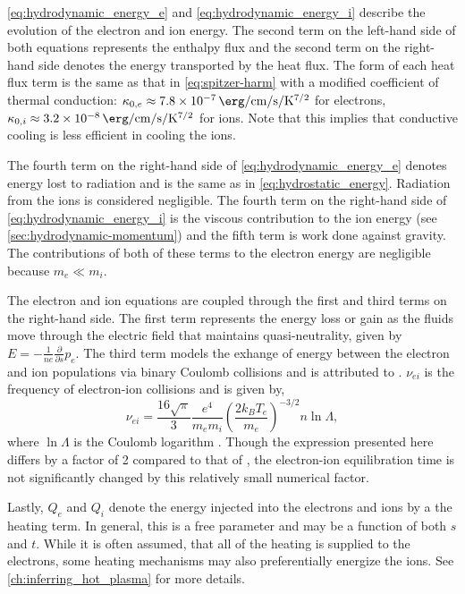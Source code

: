 \autoref{eq:hydrodynamic_energy_e} and \autoref{eq:hydrodynamic_energy_i} describe the evolution of the electron and ion energy. The second term on the left-hand side of both equations represents the enthalpy flux and the second term on the right-hand side denotes the energy transported by the heat flux. The form of each heat flux term is the same as that in \autoref{eq:spitzer-harm} with a modified coefficient of thermal conduction: $\kappa_{0,e}\approx\SI{7.8e-7}{\erg\per\cm\per\second\per\kelvin\tothe{7/2}}$ for electrons, $\kappa_{0,i}\approx\SI{3.2e-8}{\erg\per\cm\per\second\per\kelvin\tothe{7/2}}$ for ions. Note that this implies that conductive cooling is less efficient in cooling the ions. 

The fourth term on the right-hand side of \autoref{eq:hydrodynamic_energy_e} denotes energy lost to radiation and is the same as in \autoref{eq:hydrostatic_energy}. Radiation from the ions is considered negligible. The fourth term on the right-hand side of \autoref{eq:hydrodynamic_energy_i} is the viscous contribution to the ion energy (see \autoref{sec:hydrodynamic-momentum}) and the fifth term is work done against gravity. The contributions of both of these terms to the electron energy are negligible because $m_e\ll m_i$.

The electron and ion equations are coupled through the first and third terms on the right-hand side. The first term represents the energy loss or gain as the fluids move through the electric field that maintains quasi-neutrality, given by $E=-\frac{1}{ne}\frac{\partial}{\partial s}p_e$. The third term models the exhange of energy between the electron and ion populations via binary Coulomb collisions and is attributed to \citet{braginskii_transport_1965}. $\nu_{ei}$ is the frequency of electron-ion collisions and is given by,
\begin{equation}\label{eq:col_freq}
    \nu_{ei} = \frac{16\sqrt{\pi}}{3}\frac{e^4}{m_em_i}\left(\frac{2k_BT_e}{m_e}\right)^{-3/2}n\ln{\Lambda},
\end{equation}
where $\ln{\Lambda}$ is the Coulomb logarithm \citep[see both Eq. 2.5e and Section 3 of][]{braginskii_transport_1965}. Though the expression presented here differs by a factor of 2 compared to that of \citeauthor{braginskii_transport_1965}, the electron-ion equilibration time is not significantly changed by this relatively small numerical factor.

Lastly, $Q_e$ and $Q_i$ denote the energy injected into the electrons and ions by a the heating term. In general, this is a free parameter and may be a function of both $s$ and $t$. While it is often assumed, that all of the heating is supplied to the electrons, some heating mechanisms may also preferentially energize the ions. See \autoref{ch:inferring_hot_plasma} for more details. 

